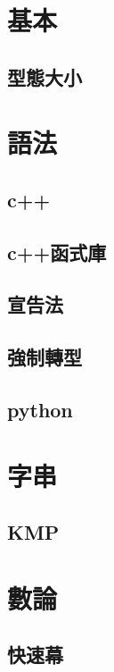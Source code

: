 \section{基本}
    \subsection{型態大小}
        
        
\section{語法}
    \subsection{c++}
        
    \subsection{c++函式庫}
        
    \subsection{宣告法}
        
    \subsection{強制轉型}
        
    \subsection{python}
        
        
\section{字串}
    \subsection{KMP}
        
    
\section{數論}
    \subsection{快速幕}
        
